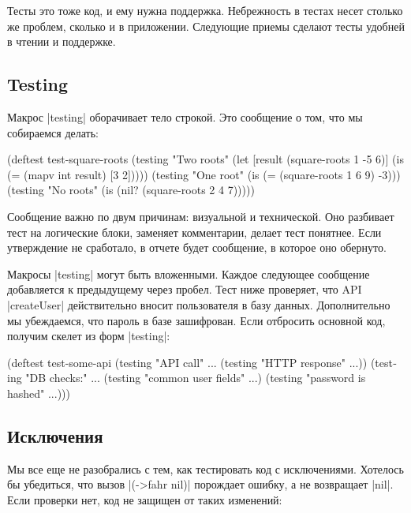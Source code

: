 Тесты это тоже код, и ему нужна поддержка. Небрежность в тестах несет столько же
проблем, сколько и в приложении. Следующие приемы сделают тесты удобней в чтении
и поддержке.

\subsection{Testing}

Макрос \spverb|testing| оборачивает тело строкой. Это сообщение о том, что мы
собираемся делать:

\begin{english}
  \begin{clojure}
(deftest test-square-roots
  (testing "Two roots"
    (let [result (square-roots 1 -5 6)]
      (is (= (mapv int result) [3 2]))))
  (testing "One root"
    (is (= (square-roots 1 6 9) -3)))
  (testing "No roots"
    (is (nil? (square-roots 2 4 7)))))
  \end{clojure}
\end{english}

Сообщение важно по двум причинам: визуальной и технической. Оно разбивает тест
на логические блоки, заменяет комментарии, делает тест понятнее. Если
утверждение не сработало, в отчете будет сообщение, в которое оно обернуто.

Макросы \spverb|testing| могут быть вложенными. Каждое следующее сообщение
добавляется к предыдущему через пробел. Тест ниже проверяет, что API
\spverb|createUser| действительно вносит пользователя в базу
данных. Дополнительно мы убеждаемся, что пароль в базе зашифрован. Если
отбросить основной код, получим скелет из форм \spverb|testing|:

\begin{english}
  \begin{clojure}
(deftest test-some-api
  (testing "API call" ...
    (testing "HTTP response" ...))
  (testing "DB checks:" ...
    (testing "common user fields" ...)
    (testing "password is hashed" ...)))
  \end{clojure}
\end{english}

\subsection{Исключения}

Мы все еще не разобрались с тем, как тестировать код с исключениями. Хотелось бы
убедиться, что вызов \spverb|(->fahr nil)| порождает ошибку, а не возвращает
\spverb|nil|. Если проверки нет, код не защищен от таких изменений:

